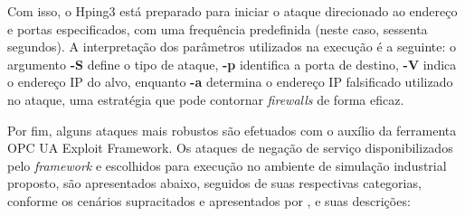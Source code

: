     Com isso, o Hping3 está preparado para iniciar o ataque direcionado ao endereço e portas especificados, com uma frequência predefinida (neste caso, sessenta segundos). A interpretação dos parâmetros utilizados na execução é a seguinte: o argumento \textbf{-S} define o tipo de ataque, \textbf{-p} identifica a porta de destino, \textbf{-V} indica o endereço IP do alvo, enquanto \textbf{-a} determina o endereço IP falsificado utilizado no ataque, uma estratégia que pode contornar \textit{firewalls} de forma eficaz.

    Por fim, alguns ataques mais robustos são efetuados com o auxílio da ferramenta OPC UA Exploit Framework. Os ataques de negação de serviço disponibilizados pelo \textit{framework} e escolhidos para execução no ambiente de simulação industrial proposto, são apresentados abaixo, seguidos de suas respectivas categorias, conforme os cenários supracitados e apresentados por , e suas descrições:

